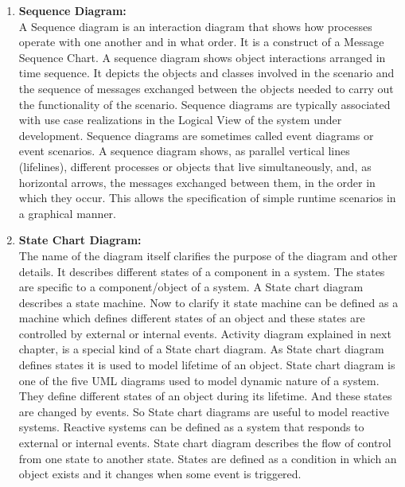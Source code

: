 \documentclass[12pt]{extreport}
\begin{document}
\begin{enumerate}
\newpage
\noindent
\item \textbf{Sequence Diagram:}\\
A Sequence diagram is an interaction diagram that shows how processes operate with
one another and in what order. It is a construct of a Message Sequence Chart. A sequence
diagram shows object interactions arranged in time sequence. It depicts the objects
and classes involved in the scenario and the sequence of messages exchanged between
the objects needed to carry out the functionality of the scenario. Sequence diagrams
are typically associated with use case realizations in the
Logical View of the system under development. Sequence diagrams are sometimes called
event diagrams or event scenarios.
A sequence diagram shows, as parallel vertical lines (lifelines), different processes
or objects that live simultaneously, and, as horizontal arrows, the messages exchanged between them, in the order in which they occur. This allows the specification of simple runtime scenarios in a graphical manner.

\item \textbf{State Chart Diagram:}\\
The name of the diagram itself clarifies the purpose of the diagram and other details. It describes different states of a component in a system. The states are specific to a component/object of a system. A State chart diagram describes a state machine. Now to clarify it state machine can be defined as a machine which defines different states of an object and these states are controlled by external or internal events. Activity diagram explained in next chapter, is a special kind of a State chart diagram. As State chart diagram defines states it is used to model lifetime of an object. State chart diagram is one of the five UML diagrams used to model dynamic nature of a system. They define different states of an object during its lifetime. And these states are changed by events. So State chart diagrams are useful to model reactive systems. Reactive systems can be defined as a system that responds to external or internal events. State chart diagram describes the flow of control from one state to another state. States are defined as a condition in which an object exists and it changes when some event is triggered.


\end{enumerate}
\end{document}
